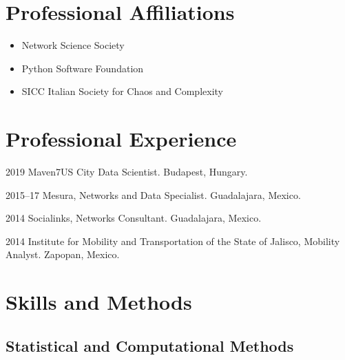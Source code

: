 \documentclass{academiccv}
\begin{document}
\section*{Professional Affiliations}
\begin{itemize}
	\item Network Science Society
	\item Python Software Foundation
	\item SICC Italian Society for Chaos and Complexity
\end{itemize}


\section*{Professional Experience}

\begin{tablist}

\item[2019] \tab Maven7US City Data Scientist. Budapest, Hungary.

\item[2015--17] \tab Mesura, Networks and Data Specialist. Guadalajara, Mexico.

\item[2014] \tab Socialinks, Networks Consultant. Guadalajara, Mexico.

\item[2014] \tab Institute for Mobility and Transportation of the State of Jalisco, Mobility Analyst. Zapopan, Mexico.

\end{tablist}









\section*{Skills and Methods}

\subsection*{Statistical and Computational Methods}
\end{document}
